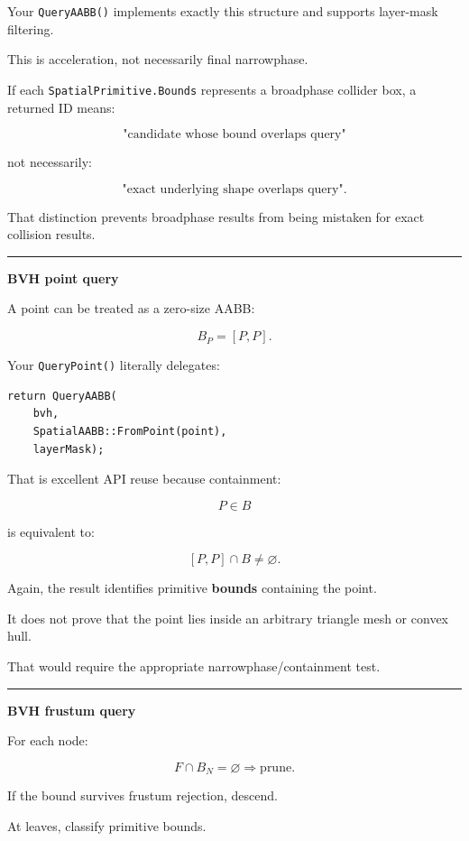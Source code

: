Your \texttt{QueryAABB()} implements exactly this structure and supports layer-mask filtering.

This is acceleration, not necessarily final narrowphase.

If each \texttt{SpatialPrimitive.Bounds} represents a broadphase collider box, a returned ID means:

\[
\text{"candidate whose bound overlaps query"}
\]

not necessarily:

\[
\text{"exact underlying shape overlaps query"}.
\]

That distinction prevents broadphase results from being mistaken for exact collision results.

\begin{center}\rule{0.5\linewidth}{0.5pt}\end{center}

\textbf{BVH point query}

A point can be treated as a zero-size AABB:

\[
B_P=[P,P].
\]

Your \texttt{QueryPoint()} literally delegates:

\begin{verbatim}
return QueryAABB(
    bvh,
    SpatialAABB::FromPoint(point),
    layerMask);
\end{verbatim}

That is excellent API reuse because containment:

\[
P\in B
\]

is equivalent to:

\[
[P,P]\cap B\ne\varnothing.
\]

Again, the result identifies primitive \textbf{bounds} containing the point.

It does not prove that the point lies inside an arbitrary triangle mesh or convex hull.

That would require the appropriate narrowphase/containment test.

\begin{center}\rule{0.5\linewidth}{0.5pt}\end{center}

\textbf{BVH frustum query}

For each node:

\[
F\cap B_N=\varnothing
\Rightarrow
\text{prune}.
\]

If the bound survives frustum rejection, descend.

At leaves, classify primitive bounds.

